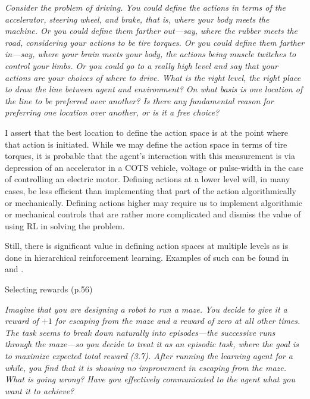 \documentclass[12pt,letterpaper]{exam}
\begin{document}
\begin{questions}
	\emph{Consider the problem of driving. You could define the actions in terms of the accelerator, 
	steering wheel, and brake, that is, where your body meets the machine. 
	Or you could define them farther out—say, where the rubber meets the road, considering your actions to be tire torques. 
	Or you could define them farther in—say, where your brain meets your body, the actions being muscle twitches to control your limbs. 
	Or you could go to a really high level and say that your actions are your choices of where to drive. 
	What is the right level, the right place to draw the line between agent and environment? 
	On what basis is one location of the line to be preferred over another? 
	Is there any fundamental reason for preferring one location over another, or is it a free choice?}
	\begin{solution}
		I assert that the best location to define the action space is at the point where that action is initiated.
		While we may define the action space in terms of tire torques, it is probable that the agent's interaction with this
		measurement is via depression of an accelerator in a COTS vehicle, voltage or pulse-width in the case of controlling
		an electric motor.
		Defining actions at a lower level will, in many cases, be less efficient than implementing that part of the action 
		algorithmically or mechanically.
		Defining actions higher may require us to implement algorithmic or mechanical controls that are rather more complicated
		and dismiss the value of using RL in solving the problem. 

		Still, there is significant value in defining action spaces at multiple levels as is done in 
		hierarchical reinforcement learning. Examples of such can be found in 
		{\cite{li2023}} and {\cite{shu2017}}.
	\end{solution}

	\setcounter{question}{7-1}%
	\question%
	Selecting rewards (p.56)

	\emph{Imagine that you are designing a robot to run a maze. 
	You decide to give it a reward of \(+1\) for escaping from the maze and a reward of zero at all other times.
	The task seems to break down naturally into episodes—the successive runs through the maze—so you decide to 
	treat it as an episodic task, where the goal is to maximize expected total reward (3.7).
	After running the learning agent for a while, you find that it is showing no improvement in escaping from the maze.
	What is going wrong? Have you effectively communicated to the agent what you want it to achieve?}
	\begin{solution}
	\end{solution}


\end{questions}
\end{document}
